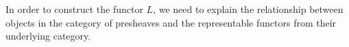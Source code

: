 \begin{frame}
In order to construct the functor $L$, we need to explain the relationship between objects in the category of presheaves and the representable functors from their underlying category.
\end{frame}